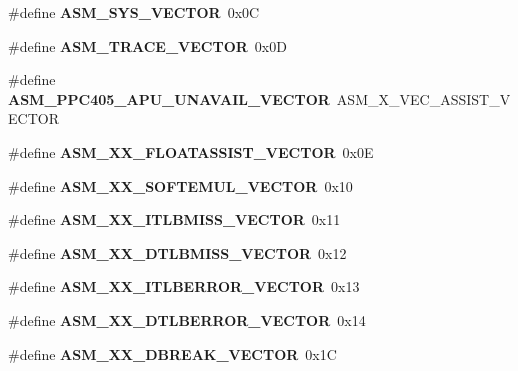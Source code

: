 \begin{DoxyCompactItemize}
\#define {\bfseries A\+S\+M\+\_\+\+S\+Y\+S\+\_\+\+V\+E\+C\+T\+OR}~0x0C
\item 
\mbox{\label{group__ppc__exc_gadff0efa00090f6db80ba49b952e1a836}} 
\#define {\bfseries A\+S\+M\+\_\+\+T\+R\+A\+C\+E\+\_\+\+V\+E\+C\+T\+OR}~0x0D
\item 
\mbox{\label{group__ppc__exc_gabd8dd2882a9ec17ce5fc6e134b8aa912}} 
\#define {\bfseries A\+S\+M\+\_\+\+P\+P\+C405\+\_\+\+A\+P\+U\+\_\+\+U\+N\+A\+V\+A\+I\+L\+\_\+\+V\+E\+C\+T\+OR}~A\+S\+M\+\_\+X\+\_\+\+V\+E\+C\+\_\+\+A\+S\+S\+I\+S\+T\+\_\+\+V\+E\+C\+T\+OR
\item 
\mbox{\label{group__ppc__exc_ga735a9ab41b6cf1239f322e6d3b2490e9}} 
\#define {\bfseries A\+S\+M\+\_\+X\+X\+\_\+\+F\+L\+O\+A\+T\+A\+S\+S\+I\+S\+T\+\_\+\+V\+E\+C\+T\+OR}~0x0E
\item 
\mbox{\label{group__ppc__exc_gabf004b6c1c53623abe7a37af7e5e1aa1}} 
\#define {\bfseries A\+S\+M\+\_\+X\+X\+\_\+\+S\+O\+F\+T\+E\+M\+U\+L\+\_\+\+V\+E\+C\+T\+OR}~0x10
\item 
\mbox{\label{group__ppc__exc_ga1c663ab9d9b091199eff1087de254b12}} 
\#define {\bfseries A\+S\+M\+\_\+X\+X\+\_\+\+I\+T\+L\+B\+M\+I\+S\+S\+\_\+\+V\+E\+C\+T\+OR}~0x11
\item 
\mbox{\label{group__ppc__exc_ga6bca62979df49d7ff0351f9f8c092d2a}} 
\#define {\bfseries A\+S\+M\+\_\+X\+X\+\_\+\+D\+T\+L\+B\+M\+I\+S\+S\+\_\+\+V\+E\+C\+T\+OR}~0x12
\item 
\mbox{\label{group__ppc__exc_ga38c282fad000ac43e48578382436f576}} 
\#define {\bfseries A\+S\+M\+\_\+X\+X\+\_\+\+I\+T\+L\+B\+E\+R\+R\+O\+R\+\_\+\+V\+E\+C\+T\+OR}~0x13
\item 
\mbox{\label{group__ppc__exc_ga9fdaaad57224a584bc588c15c1dbada2}} 
\#define {\bfseries A\+S\+M\+\_\+X\+X\+\_\+\+D\+T\+L\+B\+E\+R\+R\+O\+R\+\_\+\+V\+E\+C\+T\+OR}~0x14
\item 
\mbox{\label{group__ppc__exc_gaffc929d36851994ffd67d9b07c09dde9}} 
\#define {\bfseries A\+S\+M\+\_\+X\+X\+\_\+\+D\+B\+R\+E\+A\+K\+\_\+\+V\+E\+C\+T\+OR}~0x1C

\end{DoxyCompactItemize}

